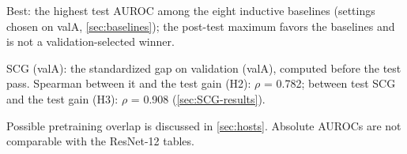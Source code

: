 \begin{table}[tbp]
\begin{minipage}{\linewidth}
Best: the highest test AUROC among the eight inductive baselines (settings chosen on valA, \cref{sec:baselines}); the post-test maximum favors the baselines and is not a validation-selected winner.\par
SCG (valA): the standardized gap on validation (valA), computed before the test pass. Spearman between it and the test gain (H2): $\rho$ = 0.782; between test SCG and the test gain (H3): $\rho$ = 0.908 (\cref{sec:SCG-results}).\par
Possible pretraining overlap is discussed in \cref{sec:hosts}. Absolute AUROCs are not comparable with the ResNet-12 tables.\par
\end{minipage}
\end{table}
